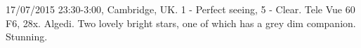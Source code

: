 \item 17/07/2015 23:30-3:00, Cambridge, UK. 1 - Perfect seeing, 5 - Clear. Tele Vue 60 F6, 28x. Algedi. Two lovely bright stars, one of which has a grey dim companion. Stunning.
